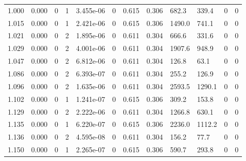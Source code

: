 \documentclass[preview]{standalone}
\begin{document}
{{{\begin{tabular}{L{1.2cm}C{1.2cm} C{0.3cm}C{0.5cm} C{1.4cm}C{1.4cm} C{1.4cm}C{1.4cm} C{1.6cm}C{1.6cm} C{1.6cm}C{1.6cm}}
  1.000  &  0.000  & 0     &  1 &  3.455e-06  & 0  &  0.615&   0.306& 682.3 & 339.4   &  0 & 0  \\ 
  1.015  &  0.000  & 0     &  1 &  2.421e-06  & 0  &  0.615&   0.306& 1490.0 & 741.1   &  0 & 0  \\ 
  1.021  &  0.000  & 0     &  2 &  1.895e-06  & 0  &  0.611&   0.304& 666.6 & 331.6   &  0 & 0  \\ 
  1.029  &  0.000  & 0     &  2 &  4.001e-06  & 0  &  0.611&   0.304& 1907.6 & 948.9   &  0 & 0  \\ 
  1.047  &  0.000  & 0     &  2 &  6.812e-06  & 0  &  0.611&   0.304& 126.8 & 63.1   &  0 & 0  \\ 
  1.086  &  0.000  & 0     &  2 &  6.393e-07  & 0  &  0.611&   0.304& 255.2 & 126.9   &  0 & 0  \\ 
  1.096  &  0.000  & 0     &  2 &  1.635e-06  & 0  &  0.611&   0.304& 2593.5 & 1290.1   &  0 & 0  \\ 
  1.102  &  0.000  & 0     &  1 &  1.241e-07  & 0  &  0.615&   0.306& 309.2 & 153.8   &  0 & 0  \\ 
  1.129  &  0.000  & 0     &  2 &  2.222e-06  & 0  &  0.611&   0.304& 1266.8 & 630.1   &  0 & 0  \\ 
  1.135  &  0.000  & 0     &  1 &  6.220e-07  & 0  &  0.615&   0.306& 2236.0 & 1112.2   &  0 & 0  \\ 
  1.136  &  0.000  & 0     &  2 &  4.595e-08  & 0  &  0.611&   0.304& 156.2 & 77.7   &  0 & 0  \\ 
  1.150  &  0.000  & 0     &  1 &  2.265e-07  & 0  &  0.615&   0.306& 590.7 & 293.8   &  0 & 0  \\ 
\hline 
\end{tabular} 

}}}
\end{document}
